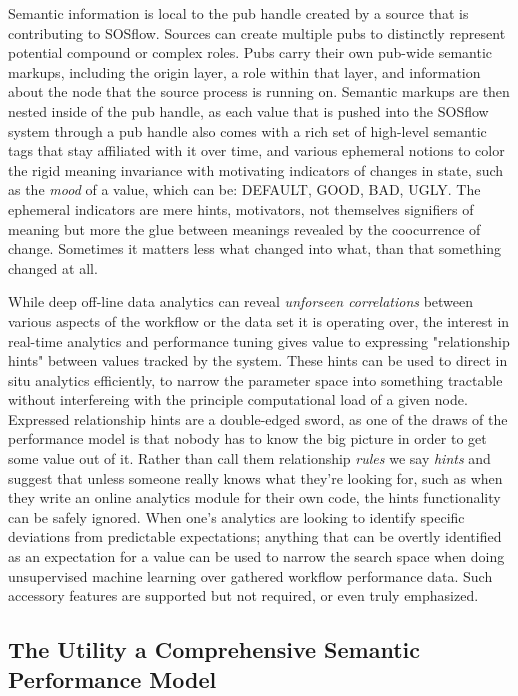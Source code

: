 Semantic information is local to the pub handle created by a source
that is contributing to SOSflow.
%
Sources can create multiple pubs to distinctly represent potential
compound or complex roles.
%
Pubs carry their own pub-wide semantic markups, including the origin
layer, a role within that layer, and information about the node that
the source process is running on.
%
Semantic markups are then nested inside of the pub handle, as each
value that is pushed into the SOSflow system through a pub handle also
comes with a rich set of high-level semantic tags that stay affiliated
with it over time, and various ephemeral notions to color the rigid
meaning invariance with motivating indicators of changes in state,
such as the \textit{mood} of a value, which can be: DEFAULT, GOOD,
BAD, UGLY.
%
The ephemeral indicators are mere hints, motivators, not themselves
signifiers of meaning but more the glue between meanings revealed by
the coocurrence of change.
%
Sometimes it matters less what changed into what, than that something
changed at all.

While deep off-line data analytics can reveal \textit{unforseen correlations}
between various aspects of the workflow or the data set it is
operating over, the interest in real-time analytics and performance
tuning gives value to expressing "relationship hints" between values
tracked by the system.
%
These hints can be used to direct in situ analytics efficiently, to
narrow the parameter space into something tractable without
interfereing with the principle computational load of a given
node.
%
Expressed relationship hints are a double-edged sword, as one of the
draws of the performance model is that nobody has to know the big
picture in order to get some value out of it.
%
Rather than call them relationship \textit{rules} we say
\textit{hints} and suggest that unless someone really knows what
they're looking for, such as when they write an online analytics
module for their own code, the hints functionality can be safely
ignored.
%
When one's analytics are looking to identify specific deviations from
predictable expectations; anything that can be overtly identified as
an expectation for a value can be used to narrow the search space when
doing unsupervised machine learning over gathered workflow performance
data.
%
Such accessory features are supported but not required, or even truly
emphasized.


\subsection{The Utility a Comprehensive Semantic Performance Model}

